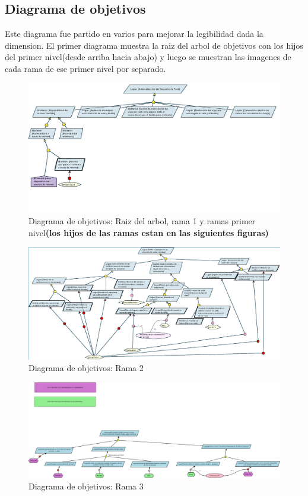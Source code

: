\subsection{Diagrama de objetivos}
Este diagrama fue partido en varios para mejorar la legibilidad dada la dimension. El primer diagrama muestra la raiz del arbol de objetivos con los hijos del primer nivel(desde arriba hacia abajo) y luego se muestran las imagenes de cada rama de ese primer nivel por separado.

\begin{figure}[h!]
  \centering        
    \includegraphics[scale=0.60]{diagramas/objetivos/objetivosrama1-main.png}
  \caption{Diagrama de objetivos: Raiz del arbol, rama 1 y ramas primer nivel\textbf{(los hijos de las ramas estan en las siguientes figuras)}}
\end{figure}

\begin{figure}[h!]
  \centering        
    \includegraphics[scale=0.45]{diagramas/objetivos/objetivosrama2.png}
  \caption{Diagrama de objetivos: Rama 2}
\end{figure}

\begin{figure}[h!]
  \centering        
    \includegraphics[scale=0.20]{diagramas/objetivos/objetivosrama3.png}
  \caption{Diagrama de objetivos: Rama 3}
\end{figure}

